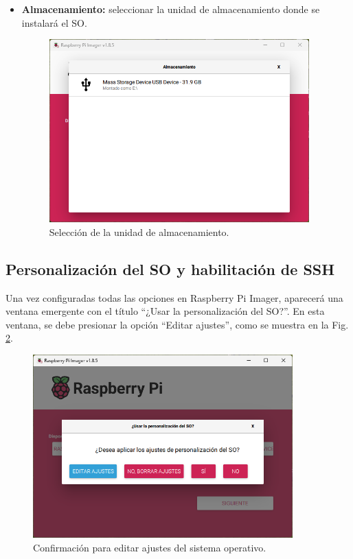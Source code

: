 \documentclass[12pt]{article}
\begin{document}
\begin{itemize}
    \item \textbf{Almacenamiento:} seleccionar la unidad de almacenamiento donde se instalará el SO.

        \begin{figure}[H]
            \centering
            \includegraphics[width=10cm]{rpi_almacenamiento.png}
            \caption{Selección de la unidad de almacenamiento.}
            \label{RPI_ALMACENAMIENTO}
        \end{figure}
\end{itemize}

\subsection{Personalización del SO y habilitación de SSH}

Una vez configuradas todas las opciones en Raspberry Pi Imager, aparecerá una ventana emergente con el título ``¿Usar la personalización del SO?''. En esta ventana, se debe presionar la opción ``Editar ajustes'', como se muestra en la Fig. \ref{RPI_confirmacion}.

\begin{figure}[H]
    \centering
    \includegraphics[width=10cm]{rpi_confirmacion.png}
    \caption{Confirmación para editar ajustes del sistema operativo.}
    \label{RPI_confirmacion}
\end{figure}
\end{document}
